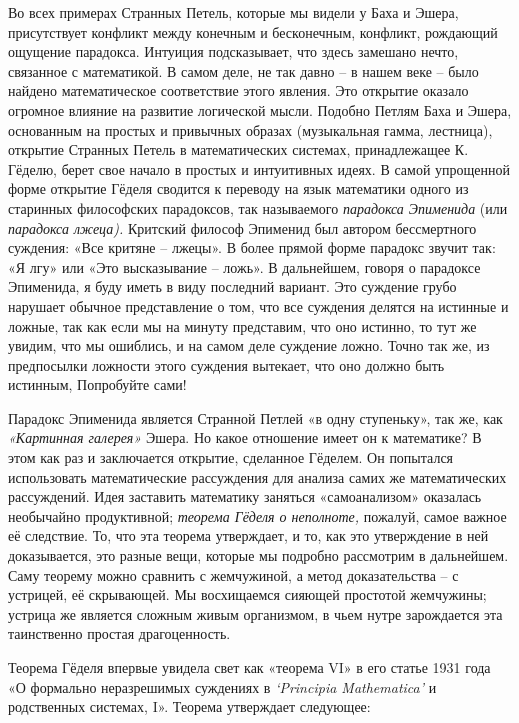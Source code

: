 \documentclass[../main.tex]{subfiles}
\begin{document}
Во всех примерах Странных Петель, которые мы видели у Баха и Эшера, присутствует конфликт между конечным и бесконечным, конфликт, рождающий ощущение парадокса. Интуиция подсказывает, что здесь замешано нечто, связанное с математикой. В самом деле, не так давно \--- в нашем веке \--- было найдено математическое соответствие этого явления. Это открытие оказало огромное влияние на развитие логической мысли. Подобно Петлям Баха и Эшера, основанным на простых и привычных образах (музыкальная гамма, лестница), открытие Странных Петель в математических системах, принадлежащее К. Гёделю, берет свое начало в простых и интуитивных идеях. В самой упрощенной форме открытие Гёделя сводится к переводу на язык математики одного из старинных философских парадоксов, так называемого \emph{парадокса Эпименида} (или \emph{парадокса лжеца).} Критский философ Эпименид был автором бессмертного суждения: «Все критяне \--- лжецы». В более прямой форме парадокс звучит так: «Я лгу» или «Это высказывание \--- ложь». В дальнейшем, говоря о парадоксе Эпименида, я буду иметь в виду последний вариант. Это суждение грубо нарушает обычное представление о том, что все суждения делятся на истинные и ложные, так как если мы на минуту представим, что оно истинно, то тут же увидим, что мы ошиблись, и на самом деле суждение ложно. Точно так же, из предпосылки ложности этого суждения вытекает, что оно должно быть истинным, Попробуйте сами!

Парадокс Эпименида является Странной Петлей «в одну ступеньку», так же, как \emph{«Картинная галерея»} Эшера. Но какое отношение имеет он к математике? В этом как раз и заключается открытие, сделанное Гёделем. Он попытался использовать математические рассуждения для анализа самих же математических рассуждений. Идея заставить математику заняться «самоанализом» оказалась необычайно продуктивной; \emph{теорема Гёделя о неполноте,} пожалуй, самое важное её следствие. То, что эта теорема утверждает, и то, как это утверждение в ней доказывается, это разные вещи, которые мы подробно рассмотрим в дальнейшем. Саму теорему можно сравнить с жемчужиной, а метод доказательства \--- с устрицей, её скрывающей. Мы восхищаемся сияющей простотой жемчужины; устрица же является сложным живым организмом, в чьем нутре зарождается эта таинственно простая драгоценность.

Теорема Гёделя впервые увидела свет как «теорема VI» в его статье 1931 года «О формально неразрешимых суждениях в \emph{\enquote*{Principia Mathematica}} и родственных системах, I». Теорема утверждает следующее:
\end{document}
